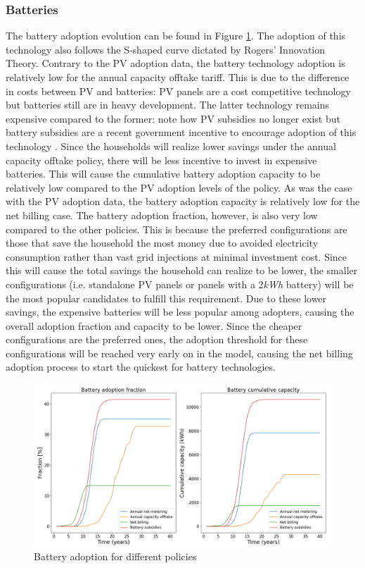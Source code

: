 \subsubsection{Batteries}
The battery adoption evolution can be found in Figure \ref{Figure:batpolvol}. The adoption of this technology also follows the S-shaped curve dictated by Rogers' Innovation Theory. Contrary to the PV adoption data, the battery technology adoption is relatively low for the annual capacity offtake tariff. This is due to the difference in costs between PV and batteries: PV panels are a cost competitive technology but batteries still are in heavy development. The latter technology remains expensive compared to the former: note how PV subsidies no longer exist but battery subsidies are a recent government incentive to encourage adoption of this technology \cite{subsidy,Zonnepanelen}. Since the households will realize lower savings under the annual capacity offtake policy, there will be less incentive to invest in expensive batteries. This will cause the cumulative battery adoption capacity to be relatively low compared to the PV adoption levels of the policy.
\newline \newline \noindent
As was the case with the PV adoption data, the battery adoption capacity is relatively low for the net billing case. The battery adoption fraction, however, is also very low compared to the other policies. This is because the preferred configurations are those that save the household the most money due to avoided electricity consumption rather than vast grid injections at minimal investment cost. Since this will cause the total savings the household can realize to be lower, the smaller configurations (i.e. standalone PV panels or panels with a 2\textit{kWh} battery) will be the most popular candidates to fulfill this requirement. Due to these lower savings, the expensive batteries will be less popular among adopters, causing the overall adoption fraction and capacity to be lower. Since the cheaper configurations are the preferred ones, the adoption threshold for these configurations will be reached very early on in the model, causing the net billing adoption process to start the quickest for battery technologies.
\begin{figure}[h!]
\centering
\includegraphics[width=12cm]{Policies/Battery.png}
\caption{Battery adoption for different policies}
\label{Figure:batpolvol}
\end{figure} 
